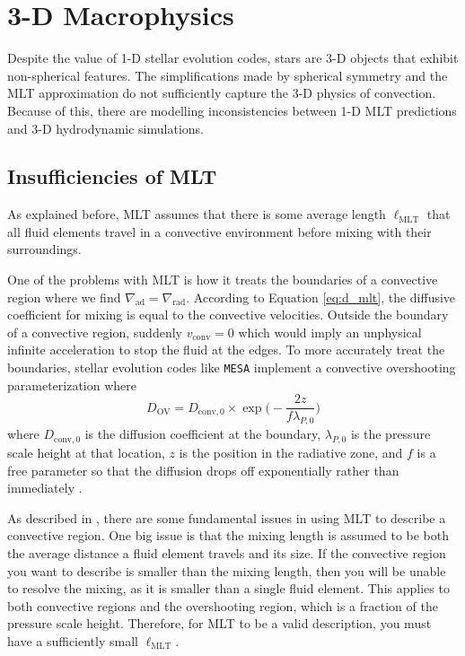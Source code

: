 \section{3-D Macrophysics}

Despite the value of 1-D stellar evolution codes, stars are 3-D objects that exhibit non-spherical features.
The simplifications made by spherical symmetry and the MLT approximation do not sufficiently capture the 3-D physics of convection.
Because of this, there are modelling inconsistencies between 1-D MLT predictions and 3-D hydrodynamic simulations.

\subsection{Insufficiencies of MLT}

As explained before, MLT assumes that there is some average length $\ell_{\mathrm{MLT}}$ that all fluid elements travel in a convective environment before mixing with their surroundings.

One of the problems with MLT is how it treats the boundaries of a convective region where we find $\nabla_{\mathrm{ad}} = \nabla_{\mathrm{rad}}$.
According to Equation \ref{eq:d_mlt}, the diffusive coefficient for mixing is equal to the convective velocities.
Outside the boundary of a convective region, suddenly $v_{\mathrm{conv}} = 0$ which would imply an unphysical infinite acceleration to stop the fluid at the edges.
To more accurately treat the boundaries, stellar evolution codes like \texttt{MESA} implement a convective overshooting parameterization where 
\begin{equation}\label{eq:d_overshoot}
    D_{\mathrm{OV}} = D_{\mathrm{conv,0}}\times\exp{\Biggl(-\frac{2z}{f\lambda_{P,0}}\Biggr)}
\end{equation}
where $D_{\mathrm{conv,0}}$ is the diffusion coefficient at the boundary, $\lambda_{P,0}$ is the pressure scale height at that location, $z$ is the position in the radiative zone, and $f$ is a free parameter so that the diffusion drops off exponentially rather than immediately \cite{paxtonMODULESEXPERIMENTSLAR2010}.

As described in \cite{renziniEmbarrassmentsCurrentTreatments1987}, there are some fundamental issues in using MLT to describe a convective region.
One big issue is that the mixing length is assumed to be both the average distance a fluid element travels and its size.
If the convective region you want to describe is smaller than the mixing length, then you will be unable to resolve the mixing, as it is smaller than a single fluid element.
This applies to both convective regions and the overshooting region, which is a fraction of the pressure scale height.
Therefore, for MLT to be a valid description, you must have a sufficiently small $\ell_{\mathrm{MLT}}$.

